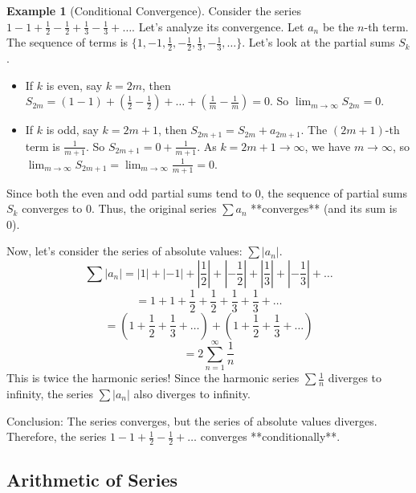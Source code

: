 \documentclass[11pt]{article}
\theoremstyle{definition}
\newtheorem{example}[theorem]{Example}
\theoremstyle{remark}
\begin{document}
\begin{example}[Conditional Convergence] \label{ex:conditional}
Consider the series $1 - 1 + \frac{1}{2} - \frac{1}{2} + \frac{1}{3} - \frac{1}{3} + \dots$.
Let's analyze its convergence. Let $a_n$ be the $n$-th term.
The sequence of terms is $\{1, -1, \frac{1}{2}, -\frac{1}{2}, \frac{1}{3}, -\frac{1}{3}, \dots \}$.
Let's look at the partial sums $S_k$.
\begin{itemize}
    \item If $k$ is even, say $k=2m$, then $S_{2m} = (1-1) + (\frac{1}{2}-\frac{1}{2}) + \dots + (\frac{1}{m}-\frac{1}{m}) = 0$. So $\lim_{m \to \infty} S_{2m} = 0$.
    \item If $k$ is odd, say $k=2m+1$, then $S_{2m+1} = S_{2m} + a_{2m+1}$. The $(2m+1)$-th term is $\frac{1}{m+1}$. So $S_{2m+1} = 0 + \frac{1}{m+1}$. As $k=2m+1 \to \infty$, we have $m \to \infty$, so $\lim_{m \to \infty} S_{2m+1} = \lim_{m \to \infty} \frac{1}{m+1} = 0$.
\end{itemize}
Since both the even and odd partial sums tend to 0, the sequence of partial sums $S_k$ converges to 0. Thus, the original series $\sum a_n$ **converges** (and its sum is 0).

Now, let's consider the series of absolute values: $\sum |a_n|$.
\[ \sum |a_n| = |1| + |-1| + |\frac{1}{2}| + |-\frac{1}{2}| + |\frac{1}{3}| + |-\frac{1}{3}| + \dots \]
\[ = 1 + 1 + \frac{1}{2} + \frac{1}{2} + \frac{1}{3} + \frac{1}{3} + \dots \]
\[ = (1 + \frac{1}{2} + \frac{1}{3} + \dots) + (1 + \frac{1}{2} + \frac{1}{3} + \dots) \]
\[ = 2 \sum_{n=1}^{\infty} \frac{1}{n} \]
This is twice the harmonic series! Since the harmonic series $\sum \frac{1}{n}$ diverges to infinity, the series $\sum |a_n|$ also diverges to infinity.

Conclusion: The series converges, but the series of absolute values diverges. Therefore, the series $1 - 1 + \frac{1}{2} - \frac{1}{2} + \dots$ converges **conditionally**.
\end{example}

\subsection{Arithmetic of Series}
\end{document}
